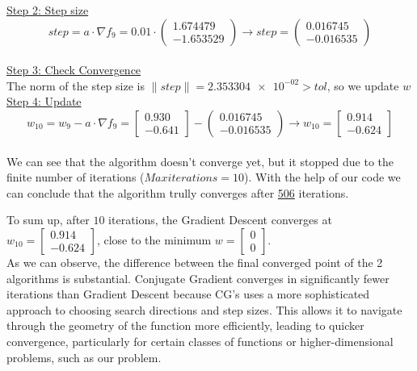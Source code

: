 \underline{Step 2: Step size}
\[
step = a \cdot \nabla f_{9} = 0.01 \cdot \left(\begin{array}{c}
	1.674479 \\
-1.653529
\end{array}\right) \rightarrow step =\left(\begin{array}{c}
	0.016745 \\
	-0.016535
\end{array}\right)
\]
\\[4mm]

\underline{Step 3: Check Convergence}\\
The norm of the step size is $\| step \| = \num{2.353304e-02} > tol$, so we update $w$
\\[4mm]

\underline{Step 4: Update}
\[ 
w_{10} = w_9 - a\cdot \nabla f_9 =  \left[\begin{array}{c}
	0.930\\
	-0.641
\end{array}\right] - \left(\begin{array}{c}
	0.016745 \\
-0.016535
\end{array}\right) \rightarrow
w_{10} = \left[\begin{array}{c}
	0.914\\
	-0.624
\end{array}\right]
\]
\\[4mm]

We can see that the algorithm doesn't converge yet, but it stopped due to the finite number of iterations ($Max iterations = 10$). With the help of our code we can conclude that the algorithm trully converges after \underline{506} iterations.

To sum up, after $10$ iterations, the Gradient Descent converges at $w_{10} = \left[\begin{array}{c}
	0.914\\
	-0.624
\end{array}\right]
$, close to the minimum $w = \left[\begin{array}{c}
	0\\
	0
\end{array}\right]$.\\

As we can observe, the difference between the final converged point of the 2 algorithms is substantial.
Conjugate Gradient converges in significantly fewer iterations than Gradient Descent because CG's uses a more sophisticated approach to choosing search directions and step sizes. This allows it to navigate through the geometry of the function more efficiently, leading to quicker convergence, particularly for certain classes of functions or higher-dimensional problems, such as our problem.


